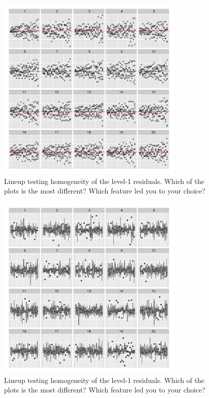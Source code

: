 \documentclass[12pt]{article} %
\begin{document}


\begin{figure}[hbt]
	\centering
	\includegraphics[width=0.8\textwidth]{dialyzerhomogeneous-dots-1-19.pdf}
	\caption{\label{homogeneous-1}
	Lineup testing homogeneity of the level-1 residuals. Which of the plots is the most different? Which feature led you to your choice?}
\end{figure}
\begin{figure}[hbt]
	\centering
	\includegraphics[width=0.8\textwidth]{dialyzerhomogeneous-1-19.pdf}
	\caption{ \label{homogeneous-2}
	Lineup testing homogeneity of the level-1 residuals. Which of the plots is the most different? Which feature led you to your choice?}
\end{figure}
\end{document}
